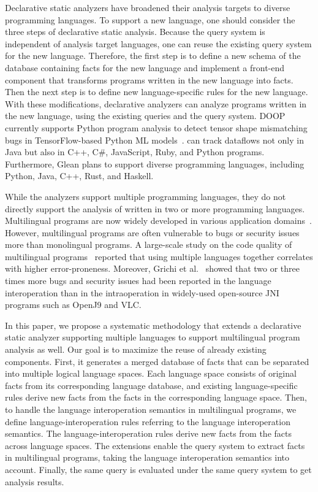 Declarative static analyzers have broadened their analysis targets
to diverse programming languages. To support a new language, one should consider
the three steps of declarative static analysis. Because the query
system is independent of analysis target languages, one can reuse the
existing query system for the new language. Therefore, the first step
is to define a new schema of the database containing facts for the new
language and implement a
front-end component that transforms programs written in the new language into facts.
Then the next step is to define new language-specific rules for the new language.  With these
modifications, declarative analyzers can analyze programs written in the new
language, using the existing queries and the query system.  DOOP currently
supports Python program analysis to detect tensor shape mismatching bugs in
TensorFlow-based Python ML models~\cite{lagouvardos2020static}.  can track dataflows not only
in Java but also in C++, C\#, JavaScript, Ruby, and Python programs.
Furthermore, Glean plans to support diverse programming languages,
including Python, Java, C++, Rust, and Haskell.

While the analyzers support multiple programming languages, they do not directly
support the analysis of  written in two or more
programming languages. Multilingual programs are now widely developed in
various application domains~\cite{kochhar2016large, mergendahlcross}. However,
multilingual programs are often vulnerable to bugs or security issues more than
monolingual programs. A large-scale study on the code quality of multilingual
programs~\cite{kochhar2016large} reported that using multiple languages
together correlates with higher error-proneness. Moreover,
Grichi et al.~\cite{grichi2020impact} showed that two or three times more bugs and security
issues had been reported in the language interoperation than in the
intraoperation in widely-used open-source JNI programs such as OpenJ9 and VLC.

In this paper, we propose a systematic methodology that extends a
declarative static analyzer supporting multiple languages to support
multilingual program analysis as well. Our goal is to maximize the reuse of
already existing components. First, it generates a merged database of facts that can
be separated into multiple logical language spaces.  Each language space
consists of original facts from its corresponding language database, and existing
language-specific rules derive new facts from the facts in the corresponding
language space. Then, to handle the language interoperation semantics in
multilingual programs, we define language-interoperation rules referring to
the language interoperation semantics. The language-interoperation rules derive new
facts from the facts across language spaces. The extensions enable the query system
to extract facts in multilingual programs, taking the language
interoperation semantics into account.
Finally, the same query is evaluated under the same query system to get
analysis results.

